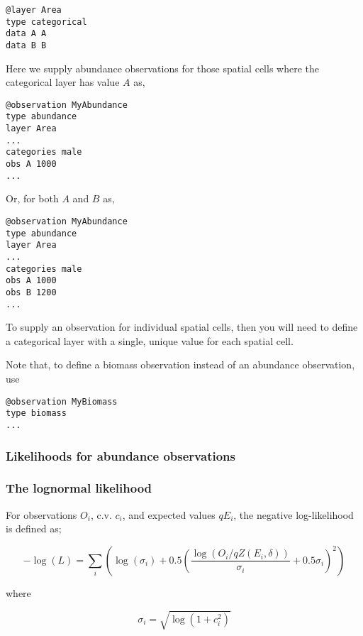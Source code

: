 {{{{{{{\small{\begin{verbatim}
@layer Area
type categorical
data A A 
data B B
\end{verbatim}}}

Here we supply abundance observations for those spatial cells where the categorical layer has value $A$ as, 

{\small{\begin{verbatim}
@observation MyAbundance
type abundance
layer Area
...
categories male 
obs A 1000
...
\end{verbatim}}}

Or, for both $A$ and $B$ as,

{\small{\begin{verbatim}
@observation MyAbundance
type abundance
layer Area
...
categories male
obs A 1000
obs B 1200
...
\end{verbatim}}}

To supply an observation for individual spatial cells, then you will need to define a categorical layer with a single, unique value for each spatial cell. 

Note that, to define a biomass observation instead of an abundance observation, use 

{\small{\begin{verbatim}
@observation MyBiomass
type biomass
...
\end{verbatim}}}

\subsubsection{Likelihoods for abundance observations}

\subsubsection*{The lognormal likelihood}

For observations $O_i$, c.v. $c_i$, and expected values $qE_i$, the negative log-likelihood is defined as;

\begin{equation}
 - \log \left(L \right) = \sum\limits_i \left( \log \left( \sigma _i \right) + 0.5\left( \frac{\log \left(O_i / q Z \left(E_i,\delta \right) \right)}{\sigma_i} + 0.5 \sigma_i \right)^2 \right)
\end{equation}

where 

\begin{equation}
  \sigma_i  = \sqrt{\log \left(1+c_i^2 \right)}
\end{equation}

}}}}}}
